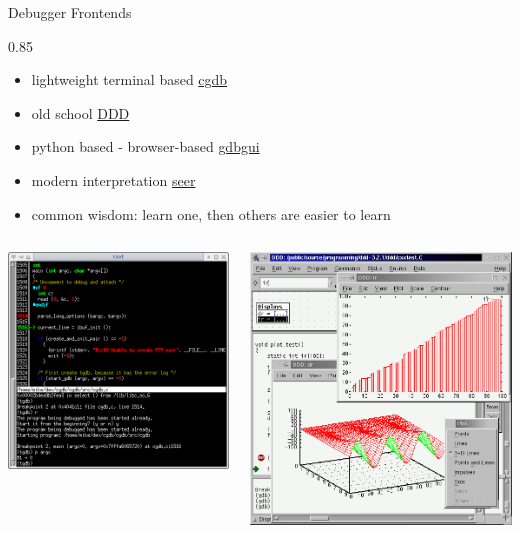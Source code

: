 \documentclass[aspectratio=1610]{beamer}
\newenvironment{centeredblock}[2][0.8\textwidth]
{ %
	\begin{center}
		\begin{varwidth}{#1} %
			\begin{block}{#2}
				\centering
			}
			{ %
			\end{block}
		\end{varwidth}
	\end{center}
}
\begin{document}
	
	\begin{frame}[fragile]{Debugger Frontends}
		\begin{centeredblock}[0.85 \textwidth]{}
			\begin{itemize}
				\item lightweight terminal based \href{https://cgdb.github.io/}{cgdb}
				\item old school \href{https://www.gnu.org/software/ddd/}{DDD}
				\item python based - browser-based \href{https://www.gdbgui.com/}{gdbgui}
				\item modern interpretation \href{https://github.com/epasveer/seer}{seer}
			\end{itemize}
			\begin{itemize}
				\item common wisdom: learn one, then others are easier to learn
			\end{itemize}
			\begin{columns}
				\centering
				\includegraphics[width=0.7\linewidth]{images/cgdb.png}
				
				\centering
				\includegraphics[width=0.7\linewidth]{images/DDD.png}
			\end{columns}
		\end{centeredblock}
	\end{frame}
	
\end{document}
